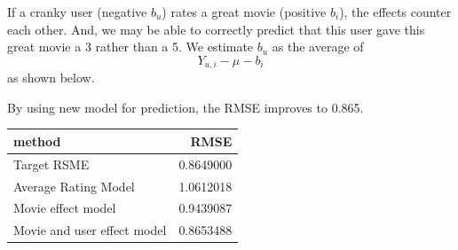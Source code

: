 \documentclass[]{article}
\newenvironment{Shaded}{\begin{snugshade}}{\end{snugshade}}
\newcommand{\DataTypeTok}[1]{\textcolor[rgb]{0.13,0.29,0.53}{#1}}
\newcommand{\DecValTok}[1]{\textcolor[rgb]{0.00,0.00,0.81}{#1}}
\newcommand{\KeywordTok}[1]{\textcolor[rgb]{0.13,0.29,0.53}{\textbf{#1}}}
\newcommand{\NormalTok}[1]{#1}
\newcommand{\OperatorTok}[1]{\textcolor[rgb]{0.81,0.36,0.00}{\textbf{#1}}}
\newcommand{\StringTok}[1]{\textcolor[rgb]{0.31,0.60,0.02}{#1}}
\begin{document}
If a cranky user (negative \(b_{u}\)) rates a great movie (positive
\(b_{i}\)), the effects counter each other. And, we may be able to
correctly predict that this user gave this great movie a 3 rather than a
5. We estimate \(b_{u}\) as the average of \[Y_{u, i} - \mu - b_{i}\] as
shown below.

\begin{Shaded}
\end{Shaded}

By using new model for prediction, the RMSE improves to 0.865.

\begin{Shaded}
\end{Shaded}

\begin{longtable}[]{@{}lr@{}}
\toprule
method & RMSE\tabularnewline
\midrule
\endhead
Target RSME & 0.8649000\tabularnewline
Average Rating Model & 1.0612018\tabularnewline
Movie effect model & 0.9439087\tabularnewline
Movie and user effect model & 0.8653488\tabularnewline
\bottomrule
\end{longtable}
\end{document}
